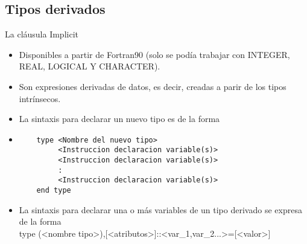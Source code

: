 
\subsection{Tipos derivados}

\begin{frame}[fragile]{La cláusula Implicit}
 \begin{itemize}[<+(0)->]
  \item Disponibles a partir de Fortran90 (solo se podía trabajar con INTEGER, REAL, LOGICAL Y CHARACTER).
  \item Son expresiones derivadas de datos, es decir, creadas a parir de los tipos intrínsecos.
  \item La sintaxis para declarar un nuevo tipo es de la forma
  \item [] 
   \begin{verbatim}
    type <Nombre del nuevo tipo>
         <Instruccion declaracion variable(s)>
         <Instruccion declaracion variable(s)>
         :
         <Instruccion declaracion variable(s)>
    end type
   \end{verbatim}
  \item La sintaxis para declarar una o más variables de un tipo derivado se expresa de la forma\\
      \centering type (<nombre tipo>),[<atributos>]::<var\_1,var\_2...>=[<valor>]
 \end{itemize}
\end{frame}